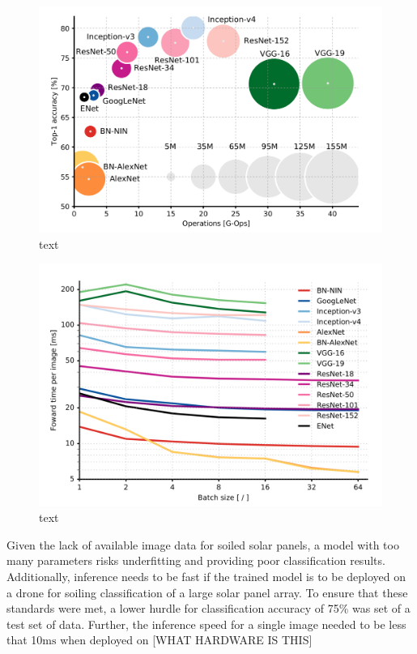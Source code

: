 \documentclass[10pt,journal,compsoc]{IEEEtran}
\begin{document}
		\begin{figure}[h]
			\centering
			\includegraphics[scale=1.1]{tradeoff}
			\caption{text}
		\end{figure}
		
		\begin{figure}[h]
			\centering
			\includegraphics[scale=1.1]{tradeoff_2}
			\caption{text}
		\end{figure}
		
		Given the lack of available image data for soiled solar panels, a model with too many parameters risks underfitting and providing poor classification results. Additionally, inference needs to be fast if the trained model is to be deployed on a drone for soiling classification of a large solar panel array. To ensure that these standards were met, a lower hurdle for classification accuracy of 75\% was set of a test set of data. Further, the inference speed for a single image needed to be less that 10$\si{\milli\second}$ when deployed on [WHAT HARDWARE IS THIS]
		
\end{document}
